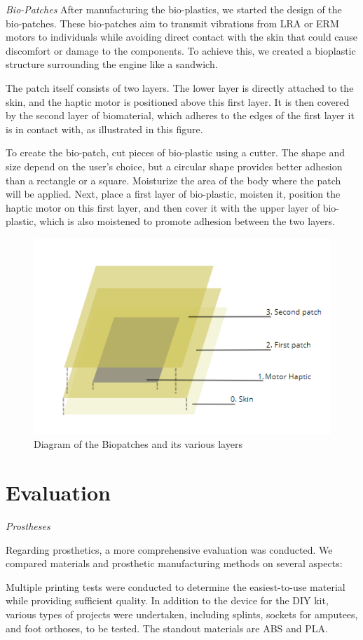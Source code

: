 \textit{Bio-Patches}
After manufacturing the bio-plastics, we started the design of the bio-patches. These bio-patches aim to transmit vibrations from LRA or ERM motors to individuals while avoiding direct contact with the skin that could cause discomfort or damage to the components. To achieve this, we created a bioplastic structure surrounding the engine like a sandwich.

The patch itself consists of two layers. The lower layer is directly attached to the skin, and the haptic motor is positioned above this first layer. It is then covered by the second layer of biomaterial, which adheres to the edges of the first layer it is in contact with, as illustrated in this figure.

To create the bio-patch, cut pieces of bio-plastic using a cutter. The shape and size depend on the user's choice, but a circular shape provides better adhesion than a rectangle or a square. Moisturize the area of the body where the patch will be applied. Next, place a first layer of bio-plastic, moisten it, position the haptic motor on this first layer, and then cover it with the upper layer of bio-plastic, which is also moistened to promote adhesion between the two layers.

\begin{figure}[h]
    \centering
    \includegraphics[width=0.5\linewidth]{YOURNAME/images/patch .png}
    \caption{Diagram of the Biopatches and its various layers}
    \label{}
\end{figure}

\section{Evaluation}

\textit{Prostheses}

Regarding prosthetics, a more comprehensive evaluation was conducted. We compared materials and prosthetic manufacturing methods on several aspects:

Multiple printing tests were conducted to determine the easiest-to-use material while providing sufficient quality. In addition to the device for the DIY kit, various types of projects were undertaken, including splints, sockets for amputees, and foot orthoses, to be tested. The standout materials are ABS and PLA. 

